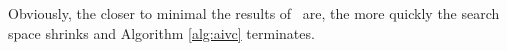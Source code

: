 \vspace{0.09in}
\indent  {}   
\vspace{0.09in}
\noindent Obviously, the closer to minimal the results of \getivc ~are, 
the more quickly the search space shrinks and Algorithm \ref{alg:aivc} terminates.

%
%
%
%
